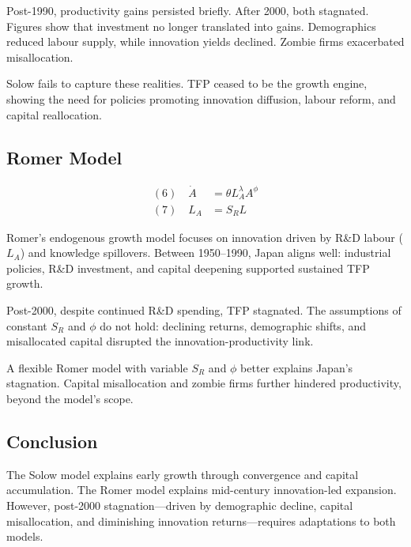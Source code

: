 Post-1990, productivity gains persisted briefly. After 2000, both stagnated. Figures show that investment no longer translated into gains. Demographics reduced labour supply, while innovation yields declined. Zombie firms exacerbated misallocation.

Solow fails to capture these realities. TFP ceased to be the growth engine, showing the need for policies promoting innovation diffusion, labour reform, and capital reallocation.

\subsection*{Romer Model}
\begin{align*}
(6)\quad \dot{A} &= \theta L_A^\lambda A^\phi \\
(7)\quad L_A &= S_R L
\end{align*}

Romer's endogenous growth model focuses on innovation driven by R\&D labour (\(L_A\)) and knowledge spillovers. Between 1950--1990, Japan aligns well: industrial policies, R\&D investment, and capital deepening supported sustained TFP growth.

Post-2000, despite continued R\&D spending, TFP stagnated. The assumptions of constant \(S_R\) and \(\phi\) do not hold: declining returns, demographic shifts, and misallocated capital disrupted the innovation-productivity link.

A flexible Romer model with variable \(S_R\) and \(\phi\) better explains Japan's stagnation. Capital misallocation and zombie firms further hindered productivity, beyond the model's scope.

\subsection*{Conclusion}
The Solow model explains early growth through convergence and capital accumulation. The Romer model explains mid-century innovation-led expansion. However, post-2000 stagnation---driven by demographic decline, capital misallocation, and diminishing innovation returns---requires adaptations to both models.


